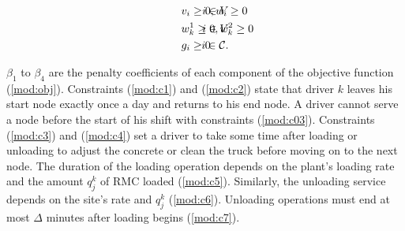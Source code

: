 \documentclass{article}
\begin{document}
\begin{alignat}{3}
    \label{mod:c37}        & v_i \geq 0,  w_i \geq 0                                                                                                                                                                                                                                                                          & \hspace{-20mm}  i \in V                                                                          \\
    \label{mod:c38}        & w^1_{k} \geq 0,  w^2_k \geq 0                                                                                                                                                                                                                                                                    & \hspace{-20mm}  i \in V                                                                          \\
    \label{mod:cend}       & g_i \geq 0                                                                                                                                                                                                                                                                                       & \hspace{-20mm}  i \in \mathcal{C}.
\end{alignat}

$\beta_1$ to $\beta_4$ are the penalty coefficients of each component of the objective function (\ref{mod:obj}). Constraints (\ref{mod:c1}) and (\ref{mod:c2}) state that driver $k$ leaves his start node exactly once a day and returns to his end node. A driver cannot serve a node before the start of his shift with constraints (\ref{mod:c03}). Constraints (\ref{mod:c3}) and (\ref{mod:c4}) set a driver to take some time after loading or unloading to adjust the concrete or clean the truck before moving on to the next node. The duration of the loading operation depends on the plant's loading rate and the amount $q^k_j$ of RMC loaded (\ref{mod:c5}). Similarly, the unloading service depends on the site's rate and $q^k_j$ (\ref{mod:c6}). Unloading operations must end at most $\Delta$ minutes after loading begins (\ref{mod:c7}).
\end{document}
